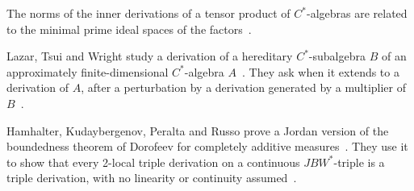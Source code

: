 The norms of the inner derivations of a tensor product of $C^*$-algebras are
related to the minimal prime ideal spaces of the
factors~\cite{WlMinimalPrimeIdealSpacesAndNorm1996}.

Lazar, Tsui and Wright study a derivation of a hereditary
$C^*$-subalgebra $B$ of an approximately finite-dimensional $C^*$-algebra $A$~\cite{WlExtendingDerivationsFromHeredi1998}.
They ask when it
extends to a derivation of $A$, after a perturbation by a derivation generated
by a multiplier of $B$~\cite{WlExtendingDerivationsFromHeredi1998}.

Hamhalter, Kudaybergenov, Peralta and Russo prove a Jordan version of
the boundedness theorem of Dorofeev for completely additive measures~\cite{WlBoundednessOfCompletelyAdditiv2015}. They use
it to
show that every 2-local triple
derivation on a continuous $JBW^*$-triple is a triple
derivation, with no linearity or continuity
assumed~\cite{WlBoundednessOfCompletelyAdditiv2015}.

